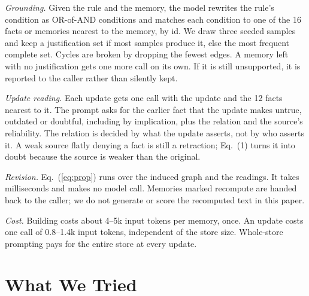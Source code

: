 \documentclass[conference]{IEEEtran}
\begin{document}
\textit{Grounding.} Given the rule and the memory, the model rewrites the rule's condition as OR-of-AND conditions and matches each condition to one of the 16 facts or memories nearest to the memory, by id. We draw three seeded samples and keep a justification set if most samples produce it, else the most frequent complete set. Cycles are broken by dropping the fewest edges. A memory left with no justification gets one more call on its own. If it is still unsupported, it is reported to the caller rather than silently kept.

\textit{Update reading.} Each update gets one call with the update and the 12 facts nearest to it. The prompt asks for the earlier fact that the update makes untrue, outdated or doubtful, including by implication, plus the relation and the source's reliability. The relation is decided by what the update asserts, not by who asserts it. A weak source flatly denying a fact is still a retraction; Eq.~(1) turns it into doubt because the source is weaker than the original.

\textit{Revision.} Eq.~(\ref{eq:prop}) runs over the induced graph and the readings. It takes milliseconds and makes no model call. Memories marked recompute are handed back to the caller; we do not generate or score the recomputed text in this paper.

\textit{Cost.} Building costs about 4--5k input tokens per memory, once. An update costs one call of 0.8--1.4k input tokens, independent of the store size. Whole-store prompting pays for the entire store at every update.

\section{What We Tried}
\label{sec:tried}
\end{document}
